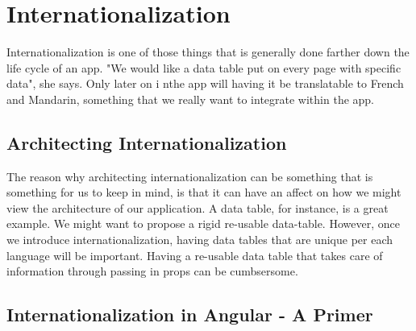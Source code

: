 \maketitle{}
\section{ Internationalization }

Internationalization is one of those things that is generally done farther down
the life cycle of an app. "We would like a data table put on every page with
specific data", she says. Only later on i nthe app will having it be
translatable to French and Mandarin, something that we really want to integrate
within the app.

\subsection{ Architecting Internationalization }
The reason why architecting internationalization can be something that is
something for us to keep in mind, is that it can have an affect on how we might
view the architecture of our application. A data table, for instance, is a great
example. We might want to propose a rigid re-usable data-table. However, once
we introduce internationalization, having data tables that are unique per each
language will be important. Having a re-usable data table that takes care of
information through passing in props can be cumbsersome.

\subsection{ Internationalization in Angular - A Primer }

